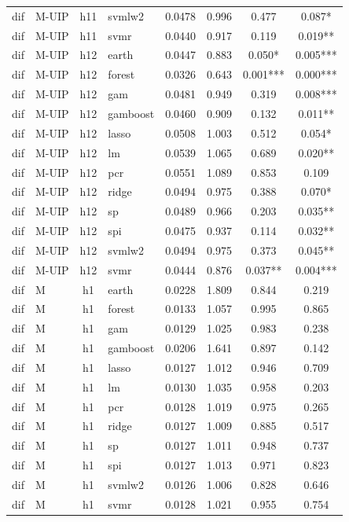 \begin{ThreePartTable}
\begin{longtable}[t]{llclcccc}
dif & M-UIP & h11 & svmlw2 & 0.0478 & 0.996 & 0.477 & 0.087*\\
dif & M-UIP & h11 & svmr & 0.0440 & 0.917 & 0.119 & 0.019**\\
\addlinespace
dif & M-UIP & h12 & earth & 0.0447 & 0.883 & 0.050* & 0.005***\\
dif & M-UIP & h12 & forest & 0.0326 & 0.643 & 0.001*** & 0.000***\\
dif & M-UIP & h12 & gam & 0.0481 & 0.949 & 0.319 & 0.008***\\
dif & M-UIP & h12 & gamboost & 0.0460 & 0.909 & 0.132 & 0.011**\\
dif & M-UIP & h12 & lasso & 0.0508 & 1.003 & 0.512 & 0.054*\\
dif & M-UIP & h12 & lm & 0.0539 & 1.065 & 0.689 & 0.020**\\
dif & M-UIP & h12 & pcr & 0.0551 & 1.089 & 0.853 & 0.109\\
dif & M-UIP & h12 & ridge & 0.0494 & 0.975 & 0.388 & 0.070*\\
dif & M-UIP & h12 & sp & 0.0489 & 0.966 & 0.203 & 0.035**\\
dif & M-UIP & h12 & spi & 0.0475 & 0.937 & 0.114 & 0.032**\\
dif & M-UIP & h12 & svmlw2 & 0.0494 & 0.975 & 0.373 & 0.045**\\
dif & M-UIP & h12 & svmr & 0.0444 & 0.876 & 0.037** & 0.004***\\
\addlinespace
dif & M & h1 & earth & 0.0228 & 1.809 & 0.844 & 0.219\\
dif & M & h1 & forest & 0.0133 & 1.057 & 0.995 & 0.865\\
dif & M & h1 & gam & 0.0129 & 1.025 & 0.983 & 0.238\\
dif & M & h1 & gamboost & 0.0206 & 1.641 & 0.897 & 0.142\\
dif & M & h1 & lasso & 0.0127 & 1.012 & 0.946 & 0.709\\
dif & M & h1 & lm & 0.0130 & 1.035 & 0.958 & 0.203\\
dif & M & h1 & pcr & 0.0128 & 1.019 & 0.975 & 0.265\\
dif & M & h1 & ridge & 0.0127 & 1.009 & 0.885 & 0.517\\
dif & M & h1 & sp & 0.0127 & 1.011 & 0.948 & 0.737\\
dif & M & h1 & spi & 0.0127 & 1.013 & 0.971 & 0.823\\
dif & M & h1 & svmlw2 & 0.0126 & 1.006 & 0.828 & 0.646\\
dif & M & h1 & svmr & 0.0128 & 1.021 & 0.955 & 0.754\\

\end{longtable}
\end{ThreePartTable}
